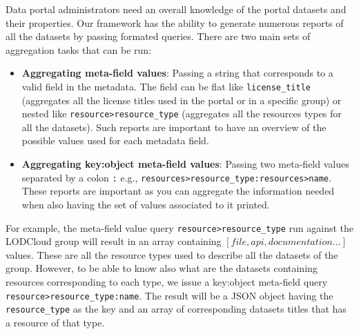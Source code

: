 \documentclass[runningheads,a4paper]{llncs}
\begin{document}
Data portal administrators need an overall knowledge of the portal datasets and their properties. Our framework has the ability to generate numerous reports of all the datasets by passing formated queries. There are two main sets of aggregation tasks that can be run:
\begin{itemize}
  \item \textbf{Aggregating meta-field values}: Passing a string that corresponds to a valid field in the metadata. The field can be flat like \texttt{license\_title} (aggregates all the license titles used in the portal or in a specific group) or nested like \texttt{resource>resource\_type} (aggregates all the resources types for all the datasets). Such reports are important to have an overview of the possible values used for each metadata field.
  \item \textbf{Aggregating key:object meta-field values}: Passing two meta-field values separated by a colon \texttt{:} e.g., \texttt{resources>resource\_type:resources>name}. These reports are important as you can aggregate the information needed when also having the set of values associated to it printed.
\end{itemize}

For example, the meta-field value query \texttt{resource>resource\_type} run against the LODCloud group will result in an array containing $[file,api,documentation ...]$ values. These are all the resource types used to describe all the datasets of the group. However, to be able to know also what are the datasets containing resources corresponding to each type, we issue a key:object meta-field query \texttt{resource>resource\_type:name}. The result will be a JSON object having the \texttt{resource\_type} as the key and an array of corresponding datasets titles that has a resource of that type.
\end{document}
